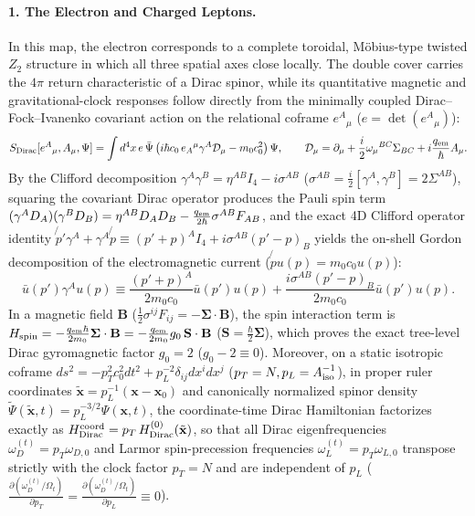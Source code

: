 \documentclass[11pt,a4paper]{article}
\begin{document}
\paragraph{1. The Electron and Charged Leptons.} In this map, the electron corresponds to a complete toroidal, Möbius-type twisted $Z_2$ structure in which all three spatial axes close locally. The double cover carries the $4\pi$ return characteristic of a Dirac spinor, while its quantitative magnetic and gravitational-clock responses follow directly from the minimally coupled Dirac--Fock--Ivanenko covariant action on the relational coframe $e^A{}_\mu$ ($e = \det(e^A{}_\mu)$):
\begin{equation}
S_{\rm Dirac}[e^A{}_\mu, A_\mu, \Psi] = \int d^4x\,e\,\bar{\Psi}\left(i\hbar c_0\,e_A{}^\mu\gamma^A\mathcal{D}_\mu - m_0 c_0^2\right)\Psi, \qquad \mathcal{D}_\mu = \partial_\mu + \frac{i}{2}\omega_\mu{}^{BC}\Sigma_{BC} + i\frac{q_{\rm em}}{\hbar}A_\mu.
\end{equation}
By the Clifford decomposition $\gamma^A\gamma^B = \eta^{AB}I_4 - i\sigma^{AB}$ ($\sigma^{AB} = \frac{i}{2}[\gamma^A,\gamma^B] = 2\Sigma^{AB}$), squaring the covariant Dirac operator produces the Pauli spin term $(\gamma^A D_A)(\gamma^B D_B) = \eta^{AB}D_A D_B - \frac{q_{\rm em}}{2\hbar}\sigma^{AB}F_{AB}$, and the exact 4D Clifford operator identity $\not{p}'\gamma^A + \gamma^A\not{p} \equiv (p'+p)^A I_4 + i\sigma^{AB}(p'-p)_B$ yields the on-shell Gordon decomposition of the electromagnetic current ($\not{p}u(p) = m_0 c_0 u(p)$):
\begin{equation}
\bar{u}(p')\gamma^A u(p) \equiv \frac{(p'+p)^A}{2 m_0 c_0}\bar{u}(p')u(p) + \frac{i\sigma^{AB}(p'-p)_B}{2 m_0 c_0}\bar{u}(p')u(p).
\end{equation}
In a magnetic field $\mathbf{B}$ ($\frac{1}{2}\sigma^{ij}F_{ij} = -\boldsymbol{\Sigma}\cdot\mathbf{B}$), the spin interaction term is $H_{\rm spin} = -\frac{q_{\rm em}\hbar}{2 m_0}\boldsymbol{\Sigma}\cdot\mathbf{B} = -\frac{q_{\rm em}}{2 m_0}g_0\,\mathbf{S}\cdot\mathbf{B}$ ($\mathbf{S} = \frac{\hbar}{2}\boldsymbol{\Sigma}$), which proves the exact tree-level Dirac gyromagnetic factor \textbf{$g_0 = 2$} ($g_0 - 2 \equiv 0$). Moreover, on a static isotropic coframe $ds^2 = -p_T^2 c_0^2 dt^2 + p_L^{-2}\delta_{ij}dx^i dx^j$ ($p_T = N, p_L = A_{\rm iso}^{-1}$), in proper ruler coordinates $\tilde{\mathbf{x}} = p_L^{-1}(\mathbf{x}-\mathbf{x}_0)$ and canonically normalized spinor density $\widetilde{\Psi}(\tilde{\mathbf{x}},t) = p_L^{-3/2}\Psi(\mathbf{x},t)$, the coordinate-time Dirac Hamiltonian factorizes exactly as $H_{\rm Dirac}^{\rm coord} = p_T\,H_{\rm Dirac}^{(0)}(\tilde{\mathbf{x}})$, so that all Dirac eigenfrequencies $\omega_D^{(t)} = p_T\omega_{D,0}$ and Larmor spin-precession frequencies $\omega_L^{(t)} = p_T\omega_{L,0}$ transpose strictly with the clock factor $p_T = N$ and are independent of $p_L$ ($\frac{\partial(\omega_D^{(t)}/\Omega_t)}{\partial p_T} = \frac{\partial(\omega_D^{(t)}/\Omega_t)}{\partial p_L} \equiv 0$).
\end{document}
